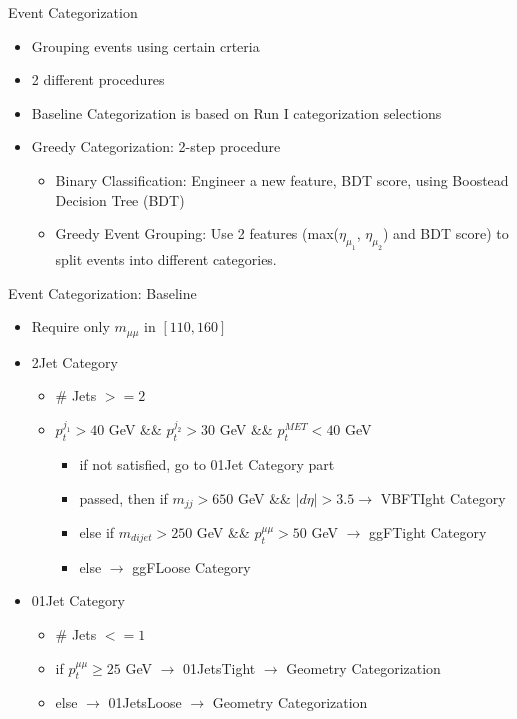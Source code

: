 \documentclass[pdf, 9pt]{beamer}
\begin{document}
  \begin{frame}{Event Categorization}
    \begin{itemize}
      \item Grouping events using certain crteria
      \item 2 different procedures
      \item \alert{Baseline Categorization} is based on Run I categorization selections
      \item \alert{Greedy Categorization}: 2-step procedure
        \begin{itemize}
          \item Binary Classification: Engineer a new feature, BDT score, using Boostead Decision Tree (BDT)
          \item Greedy Event Grouping: Use 2 features (max($\eta_{\mu_1}$, $\eta_{\mu_2}$) and BDT score) to split events into different categories.
        \end{itemize}
    \end{itemize}
  \end{frame}

  \begin{frame}{Event Categorization: Baseline}
    \begin{itemize}
      \item Require only $m_{\mu\mu}$ in $[110, 160]$
      \item \alert{2Jet} Category
        \begin{itemize}
          \item \# Jets $>=2$
          \item $p_{t}^{j_1}>40$ GeV \&\& $p_{t}^{j_2}>30$ GeV \&\& $p_{t}^{MET}<40$ GeV
            \begin{itemize}
              \item if not satisfied, go to \alert{01Jet} Category part
              \item passed, then if $m_{jj}>650$ GeV \&\& $|d\eta|>3.5 \rightarrow$ \alert{VBFTIght} Category
              \item else if $m_{dijet}>250$ GeV \&\& $p_{t}^{\mu\mu}>50$ GeV $\rightarrow$ \alert{ggFTight} Category
              \item else $\rightarrow$ \alert{ggFLoose} Category
            \end{itemize}
        \end{itemize}
      \item \alert{01Jet} Category
        \begin{itemize}
          \item \# Jets $<=1$
          \item if $p_{t}^{\mu\mu} \ge 25$ GeV $\rightarrow$ \alert{01JetsTight} $\rightarrow$ Geometry Categorization
          \item else $\rightarrow$ \alert{01JetsLoose} $\rightarrow$ Geometry Categorization
        \end{itemize}
    \end{itemize}
  \end{frame}
\end{document}
